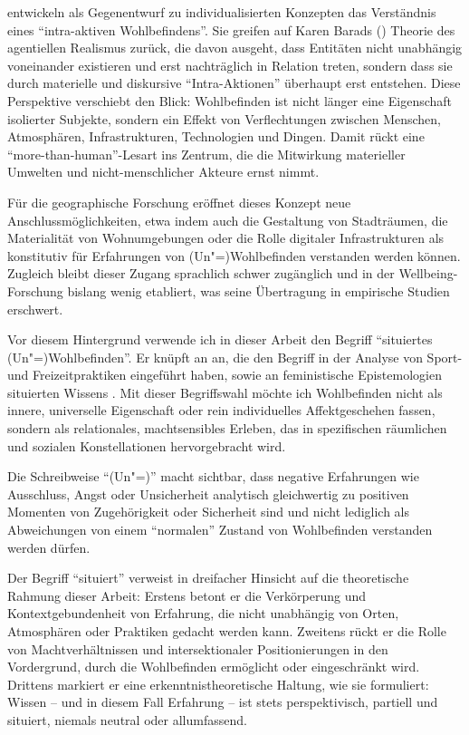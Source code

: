 \textcite{smithWhichBeingWellbeing2018} entwickeln als Gegenentwurf zu individualisierten Konzepten das Verständnis eines \enquote{intra-aktiven Wohlbefindens}. Sie greifen auf Karen Barads (\citeyear{baradMeetingUniverseHalfway2007}) Theorie des agentiellen Realismus zurück, die davon ausgeht, dass Entitäten nicht unabhängig voneinander existieren und erst nachträglich in Relation treten, sondern dass sie durch materielle und diskursive \enquote{Intra-Aktionen} überhaupt erst entstehen. Diese Perspektive verschiebt den Blick: Wohlbefinden ist nicht länger eine Eigenschaft isolierter Subjekte, sondern ein Effekt von Verflechtungen zwischen Menschen, Atmosphären, Infrastrukturen, Technologien und Dingen. Damit rückt eine \enquote{more-than-human}-Lesart ins Zentrum, die die Mitwirkung materieller Umwelten und nicht-menschlicher Akteure ernst nimmt. 

Für die geographische Forschung eröffnet dieses Konzept neue Anschlussmöglichkeiten, etwa indem auch die Gestaltung von Stadträumen, die Materialität von Wohnumgebungen oder die Rolle digitaler Infrastrukturen als konstitutiv für Erfahrungen von (Un\nobreakdash"=)Wohlbefinden verstanden werden können. Zugleich bleibt dieser Zugang sprachlich schwer zugänglich und in der Wellbeing-Forschung bislang wenig etabliert, was seine Übertragung in empirische Studien erschwert.

Vor diesem Hintergrund verwende ich in dieser Arbeit den Begriff \enquote{situiertes (Un\nobreakdash"=)Wohlbefinden}. Er knüpft an \textcite{leeUnderstandingDisruptedParticipation2021} an, die den Begriff in der Analyse von Sport- und Freizeitpraktiken eingeführt haben, sowie an feministische Epistemologien situierten Wissens \parencite{harawaySituatedKnowledgesScience1988}. Mit dieser Begriffswahl möchte ich Wohlbefinden nicht als innere, universelle Eigenschaft oder rein individuelles Affektgeschehen fassen, sondern als relationales, machtsensibles Erleben, das in spezifischen räumlichen und sozialen Konstellationen hervorgebracht wird. 

Die Schreibweise \enquote{(Un\nobreakdash"=)} macht sichtbar, dass negative Erfahrungen wie Ausschluss, Angst oder Unsicherheit analytisch gleichwertig zu positiven Momenten von Zugehörigkeit oder Sicherheit sind und nicht lediglich als Abweichungen von einem \enquote{normalen} Zustand von Wohlbefinden verstanden werden dürfen. 

Der Begriff \enquote{situiert} verweist in dreifacher Hinsicht auf die theoretische Rahmung dieser Arbeit: Erstens betont er die Verkörperung und Kontextgebundenheit von Erfahrung, die nicht unabhängig von Orten, Atmosphären oder Praktiken gedacht werden kann. Zweitens rückt er die Rolle von Machtverhältnissen und intersektionaler Positionierungen in den Vordergrund, durch die Wohlbefinden ermöglicht oder eingeschränkt wird. Drittens markiert er eine erkenntnistheoretische Haltung, wie sie \textcite{harawaySituatedKnowledgesScience1988} formuliert: Wissen -- und in diesem Fall Erfahrung -- ist stets perspektivisch, partiell und situiert, niemals neutral oder allumfassend. 

